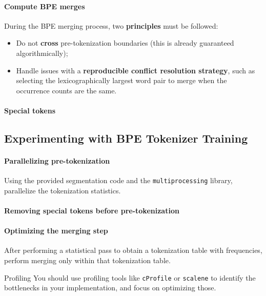 \paragraph{Compute BPE merges} During the BPE merging process, two \textbf{principles} must be followed:

\begin{itemize}[itemsep=0pt, parsep=0pt, topsep=0pt]
    \item Do not \textbf{cross} pre-tokenization boundaries (this is already guaranteed algorithmically);
    \item Handle issues with a \textbf{reproducible conflict resolution strategy}, such as selecting the lexicographically largest word pair to merge when the occurrence counts are the same.
\end{itemize}

\paragraph{Special tokens}

\subsection{Experimenting with BPE Tokenizer Training}

\paragraph{Parallelizing pre-tokenization} Using the provided segmentation code and the \texttt{multiprocessing} library, parallelize the tokenization statistics.

\paragraph{Removing special tokens before pre-tokenization}

\paragraph{Optimizing the merging step} After performing a statistical pass to obtain a tokenization table with frequencies, perform merging only within that tokenization table.

\begin{tipbox}{Profiling}
    You should use profiling tools like \texttt{cProfile} or \texttt{scalene} to identify the bottlenecks in your implementation, and focus on optimizing those.
\end{tipbox}

